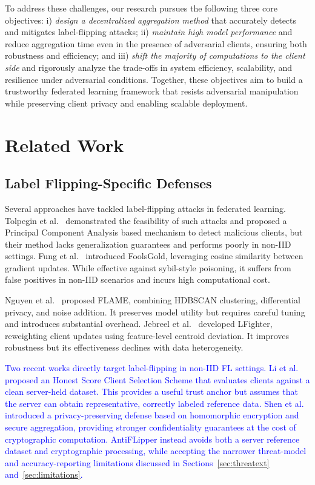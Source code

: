 \documentclass[conference]{IEEEtran}
\begin{document}
To address these challenges, our research pursues the following three core objectives: i) \textit{design a decentralized aggregation method} that accurately detects and mitigates label-flipping attacks; ii) \textit{maintain high model performance} and reduce aggregation time even in the presence of adversarial clients, ensuring both robustness and efficiency; and iii) \textit{shift the majority of computations to the client side} and rigorously analyze the trade-offs in system efficiency, scalability, and resilience under adversarial conditions. Together, these objectives aim to build a trustworthy federated learning framework that resists adversarial manipulation while preserving client privacy and enabling scalable deployment.


\section{Related Work}
\label{sec:relatedworks}

\subsection{Label Flipping-Specific Defenses}
Several approaches have tackled label-flipping attacks in federated learning. Tolpegin et al.~\cite{tolpegin2020data} demonstrated the feasibility of such attacks and proposed a Principal Component Analysis based mechanism to detect malicious clients, but their method lacks generalization guarantees and performs poorly in non-IID settings. Fung et al.~\cite{fung2020limitations} introduced FoolsGold, leveraging cosine similarity between gradient updates. While effective against sybil-style poisoning, it suffers from false positives in non-IID scenarios and incurs high computational cost. 

Nguyen et al.~\cite{nguyen2022flame} proposed FLAME, combining HDBSCAN clustering, differential privacy, and noise addition. It preserves model utility but requires careful tuning and introduces substantial overhead. Jebreel et al.~\cite{jebreel2024lfighter} developed LFighter, reweighting client updates using feature-level centroid deviation. It improves robustness but its effectiveness declines with data heterogeneity.

\textcolor{blue}{Two recent works directly target label-flipping in non-IID FL settings. Li et al.~\cite{li2023hscs} proposed an Honest Score Client Selection Scheme that evaluates clients against a clean server-held dataset. This provides a useful trust anchor but assumes that the server can obtain representative, correctly labeled reference data. Shen et al.~\cite{shen2024lfrppfl} introduced a privacy-preserving defense based on homomorphic encryption and secure aggregation, providing stronger confidentiality guarantees at the cost of cryptographic computation. AntiFLipper instead avoids both a server reference dataset and cryptographic processing, while accepting the narrower threat-model and accuracy-reporting limitations discussed in Sections~\ref{sec:threatext} and~\ref{sec:limitations}.}
\end{document}
